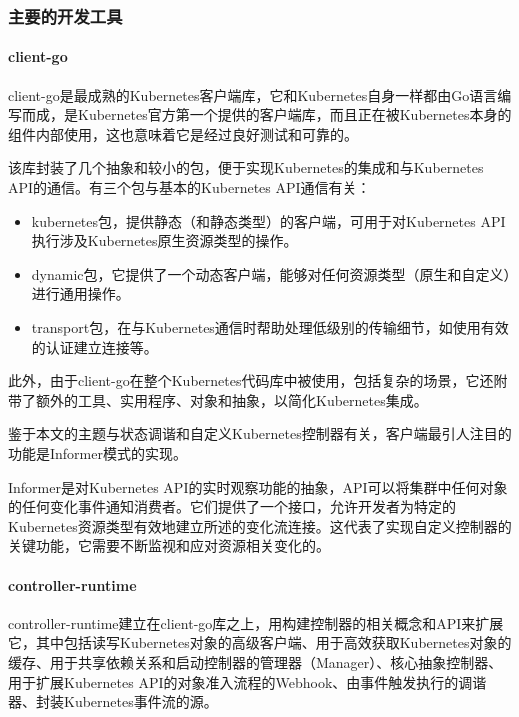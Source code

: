 \documentclass[macfonts,master]{njuthesis}
\begin{document}
\subsubsection{主要的开发工具}\label{section:wayofimplement}

\paragraph{client-go}



client-go是最成熟的Kubernetes客户端库，它和Kubernetes自身一样都由Go语言编写而成，是Kubernetes官方第一个提供的客户端库，而且正在被Kubernetes本身的组件内部使用，这也意味着它是经过良好测试和可靠的\cite{controllerclientgo}。

该库封装了几个抽象和较小的包，便于实现Kubernetes的集成和与Kubernetes API的通信。有三个包与基本的Kubernetes API通信有关\cite{controllerclientgo}：

\begin{itemize}
	\item kubernetes包，提供静态（和静态类型）的客户端，可用于对Kubernetes API执行涉及Kubernetes原生资源类型的操作。
	\item dynamic包，它提供了一个动态客户端，能够对任何资源类型（原生和自定义）进行通用操作。
	\item transport包，在与Kubernetes通信时帮助处理低级别的传输细节，如使用有效的认证建立连接等。
\end{itemize}

此外，由于client-go在整个Kubernetes代码库中被使用，包括复杂的场景，它还附带了额外的工具、实用程序、对象和抽象，以简化Kubernetes集成。

鉴于本文的主题与状态调谐和自定义Kubernetes控制器有关，客户端最引人注目的功能是Informer模式的实现\cite{informer}。

Informer是对Kubernetes API的实时观察功能的抽象，API可以将集群中任何对象的任何变化事件通知消费者。它们提供了一个接口，允许开发者为特定的Kubernetes资源类型有效地建立所述的变化流连接\cite{informer}。这代表了实现自定义控制器的关键功能，它需要不断监视和应对资源相关变化的。


\paragraph{controller-runtime}

controller-runtime建立在client-go库之上，用构建控制器的相关概念和API来扩展它，其中包括\cite{k8s-sigs}读写Kubernetes对象的高级客户端、用于高效获取Kubernetes对象的缓存、用于共享依赖关系和启动控制器的管理器（Manager）、核心抽象控制器、用于扩展Kubernetes API的对象准入流程的Webhook、由事件触发执行的调谐器、封装Kubernetes事件流的源。
\end{document}
